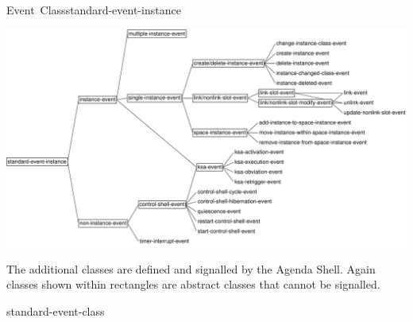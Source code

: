 \documentclass[10pt,twoside,english,pdftex]{article}
\begin{document}
\begin{functiondoc}{Event~Class}{standard-event-instance}{}
\T\begin{ifhtml}
\T\end{ifhtml}
\W\begin{iftex} 
\begin{center}
\includegraphics[scale=0.85]{agenda-shell-events}
\end{center}
\W\end{iftex}

\noindent The additional  classes are
defined and signalled by the Agenda Shell.  Again classes shown within
rectangles are abstract classes that cannot be signalled.

\begin{alsos}{standard-event-class}
\end{alsos}

\end{functiondoc}

\end{document}
